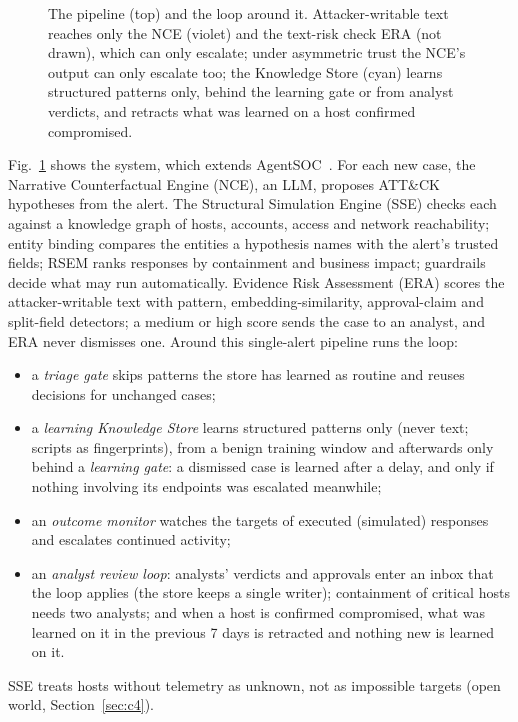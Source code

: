 \documentclass[conference]{IEEEtran}
\begin{document}
\begin{figure}[t]
\caption{The pipeline (top) and the loop around it. Attacker-writable text reaches only the NCE (violet) and the
text-risk check ERA (not drawn), which can only escalate; under asymmetric trust the NCE's output can only escalate
too; the
Knowledge Store (cyan) learns structured patterns only, behind the learning gate or from analyst verdicts, and
retracts what was learned on a host confirmed compromised.}
\label{fig:pipeline}
\end{figure}
Fig.~\ref{fig:pipeline} shows the system, which extends AgentSOC~\cite{agentsoc}. For each new case, the Narrative Counterfactual Engine (NCE), an LLM, proposes ATT\&CK~\cite{attack} hypotheses from the alert.
The Structural Simulation Engine (SSE) checks each against a knowledge graph of hosts, accounts, access and network
reachability; entity binding compares the entities a hypothesis names with the alert's trusted fields; RSEM ranks
responses by containment and business impact; guardrails decide what may run automatically. Evidence Risk
Assessment (ERA) scores the attacker-writable text with pattern, embedding-similarity, approval-claim and
split-field detectors; a medium or high score sends the case to an analyst, and ERA never dismisses one. Around
this single-alert pipeline runs the loop:
\begin{itemize}
\item a \emph{triage gate} skips patterns the store has learned as routine and reuses decisions for unchanged cases;
\item a \emph{learning Knowledge Store} learns structured patterns only (never text; scripts as fingerprints), from
  a benign training window and afterwards only behind a \emph{learning gate}: a dismissed case is learned after a
  delay, and only if nothing involving its endpoints was escalated meanwhile;
\item an \emph{outcome monitor} watches the targets of executed (simulated) responses and escalates continued activity;
\item an \emph{analyst review loop}: analysts' verdicts and approvals enter an inbox that the loop applies (the store
  keeps a single writer); containment of critical hosts needs two analysts; and when a host is confirmed
  compromised, what was learned on it in the previous 7 days is retracted and nothing new is learned on it.
\end{itemize}
SSE treats hosts without telemetry as unknown, not as impossible targets (open world, Section~\ref{sec:c4}).
\end{document}
